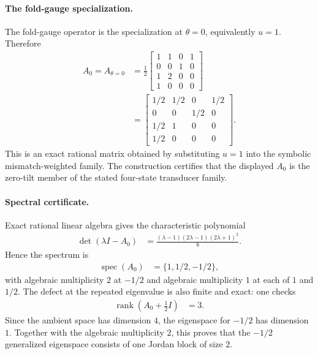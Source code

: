 \paragraph{The fold-gauge specialization.}
The fold-gauge operator is the specialization at $\theta=0$, equivalently $u=1$.  Therefore
$$
\begin{aligned}
A_0=A_{\theta=0}
&=\frac{1}{2}
\left[
\begin{array}{cccc}
1 & 1 & 0 & 1\\
0 & 0 & 1 & 0\\
1 & 2 & 0 & 0\\
1 & 0 & 0 & 0
\end{array}
\right]\\
&=
\left[
\begin{array}{cccc}
1/2 & 1/2 & 0 & 1/2\\
0 & 0 & 1/2 & 0\\
1/2 & 1 & 0 & 0\\
1/2 & 0 & 0 & 0
\end{array}
\right].
\end{aligned}
$$
This is an exact rational matrix obtained by substituting $u=1$ into the symbolic mismatch-weighted family.  The construction certifies that the displayed $A_0$ is the zero-tilt member of the stated four-state transducer family.

\paragraph{Spectral certificate.}
Exact rational linear algebra gives the characteristic polynomial
$$
\begin{aligned}
\det(\lambda I-A_0)
&=\frac{(\lambda-1)(2\lambda-1)(2\lambda+1)^2}{8}.
\end{aligned}
$$
Hence the spectrum is
$$
\begin{aligned}
\operatorname{spec}(A_0)&=\{1,1/2,-1/2\},
\end{aligned}
$$
with algebraic multiplicity $2$ at $-1/2$ and algebraic multiplicity $1$ at each of $1$ and $1/2$.  The defect at the repeated eigenvalue is also finite and exact: one checks
$$
\begin{aligned}
\operatorname{rank}\left(A_0+\frac{1}{2}I\right)&=3.
\end{aligned}
$$
Since the ambient space has dimension $4$, the eigenspace for $-1/2$ has dimension $1$.  Together with the algebraic multiplicity $2$, this proves that the $-1/2$ generalized eigenspace consists of one Jordan block of size $2$.

